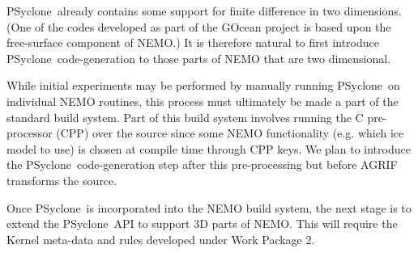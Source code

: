 \documentclass{article}
\newcommand{\psyclone}{{PS}yclone}
\begin{document}
\psyclone\ already contains some support for finite difference in two
dimensions.  (One of the codes developed as part of the GOcean project
is based upon the free-surface component of NEMO.) It is therefore
natural to first introduce \psyclone\ code-generation to those parts of NEMO
that are two dimensional.

While initial experiments may be performed by manually running
\psyclone\ on individual NEMO routines, this process must ultimately be
made a part of the standard build system. Part of this build system
involves running the C pre-processor (CPP) over the source since some
NEMO functionality (e.g. which ice model to use) is chosen at compile
time through CPP keys. We plan to introduce the \psyclone\
code-generation step after this pre-processing but before AGRIF
transforms the source.

Once \psyclone\ is incorporated into the NEMO build system, the next
stage is to extend the \psyclone\ API to support 3D parts of NEMO.  This
will require the Kernel meta-data and rules developed under Work
Package 2.
\end{document}
